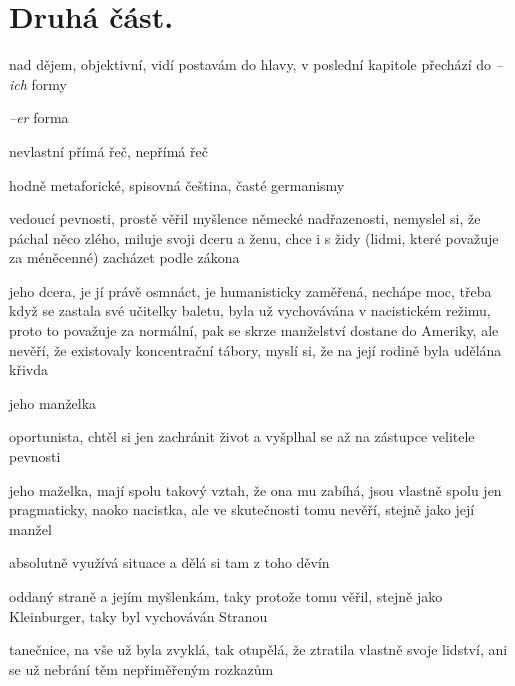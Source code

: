 \documentclass{article}
\begin{document}
\section{Druhá část.}
\begin{description}
    \setlength\itemsep{0.15em}
    \item[vypravěč:] nad dějem, objektivní, vidí postavám do hlavy, v poslední kapitole přechází do \textit{--ich} formy
    \item[vyprávěcí způsoby:] \textit{--er} forma
    \item[typy promluv:] nevlastní přímá řeč, nepřímá řeč
    \item[jazyková stránka:] hodně metaforické, spisovná čeština, časté germanismy
    \item[postavy:]
        \begin{description}
            \setlength\itemsep{0.15em}
            \item[Karel Kleinburger,] vedoucí pevnosti, prostě věřil myšlence německé nadřazenosti, nemyslel si, že páchal něco zlého, miluje svoji dceru a ženu, chce i s židy (lidmi, které považuje za méněcenné) zacházet podle zákona
            \item[Kristina,] jeho dcera, je jí právě osmnáct, je humanisticky zaměřená, nechápe moc, třeba když se zastala své učitelky baletu, byla už vychovávána v nacistickém režimu, proto to považuje za normální, pak se skrze manželství dostane do Ameriky, ale nevěří, že existovaly koncentrační tábory, myslí si, že na její rodině byla udělána křivda
            \item[Gertruda,] jeho manželka
            \item[Grube,] oportunista, chtěl si jen zachránit život a vyšplhal se až na zástupce velitele pevnosti
            \item[Monika Grubeová,] jeho maželka, mají spolu takový vztah, že ona mu zabíhá, jsou vlastně spolu jen pragmaticky, naoko nacistka, ale ve skutečnosti tomu nevěří, stejně jako její manžel
            \item[Kolatschek,] absolutně využívá situace a dělá si tam z toho děvín
            \item[Weismüller,] oddaný straně a jejím myšlenkám, taky protože tomu věřil, stejně jako Kleinburger, taky byl vychováván Stranou
            \item[Anna,] tanečnice, na vše už byla zvyklá, tak otupělá, že ztratila vlastně svoje lidství, ani se už nebrání těm nepřiměřeným rozkazům
        \end{description}

\end{description}
\end{document}
